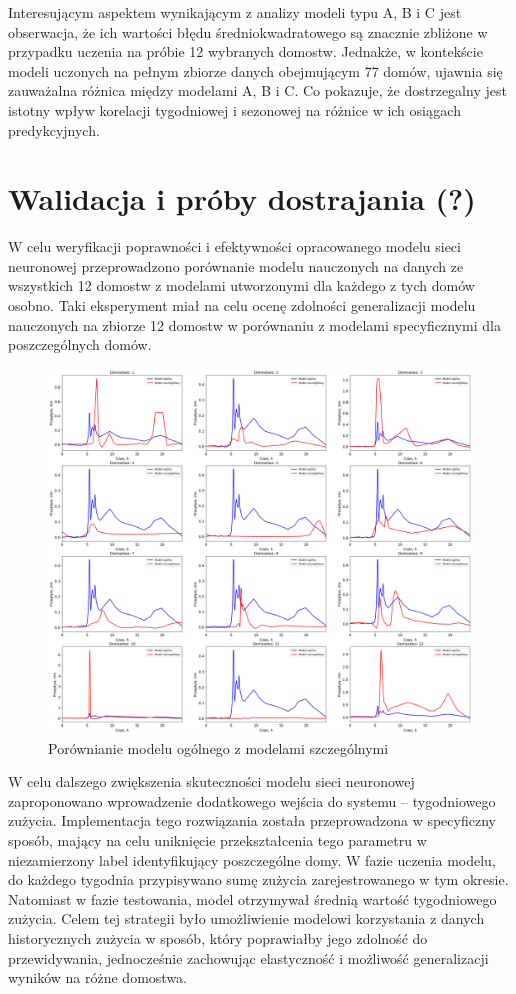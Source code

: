 \documentclass[a4paper,twoside,12pt]{book}
\begin{document}
Interesującym aspektem wynikającym z analizy modeli typu A, B i C jest obserwacja, że ich wartości błędu średniokwadratowego są znacznie zbliżone w przypadku uczenia na próbie 12 wybranych domostw. Jednakże, w kontekście modeli uczonych na pełnym zbiorze danych obejmującym 77 domów, ujawnia się zauważalna różnica między modelami A, B i C. Co pokazuje, że dostrzegalny jest istotny wpływ korelacji tygodniowej i sezonowej na różnice w ich osiągach predykcyjnych.
\newpage
\section{Walidacja i próby dostrajania (?)}
W celu weryfikacji poprawności i efektywności opracowanego modelu sieci neuronowej przeprowadzono porównanie modelu nauczonych na danych ze wszystkich 12 domostw z modelami utworzonymi dla każdego z tych domów osobno. Taki eksperyment miał na celu ocenę zdolności generalizacji modelu nauczonych na zbiorze 12 domostw w porównaniu z modelami specyficznymi dla poszczególnych domów.

\begin{figure}[!h]
  \centering
  \includegraphics[width=1\textwidth]{img/szczegółowy_ogolny_porówniaie.png}
  \caption{Porównianie modelu ogólnego z modelami szczególnymi}
  \label{fig:etykieta-rysunku}
\end{figure}


W celu dalszego zwiększenia skuteczności modelu sieci neuronowej zaproponowano wprowadzenie dodatkowego wejścia do systemu – tygodniowego zużycia. Implementacja tego rozwiązania została przeprowadzona w specyficzny sposób, mający na celu uniknięcie przekształcenia tego parametru w niezamierzony label identyfikujący poszczególne domy. W fazie uczenia modelu, do każdego tygodnia przypisywano sumę zużycia zarejestrowanego w tym okresie. Natomiast w fazie testowania, model otrzymywał średnią wartość tygodniowego zużycia. Celem tej strategii było umożliwienie modelowi korzystania z danych historycznych zużycia w sposób, który poprawiałby jego zdolność do przewidywania, jednocześnie zachowując elastyczność i możliwość generalizacji wyników na różne domostwa.
\end{document}
